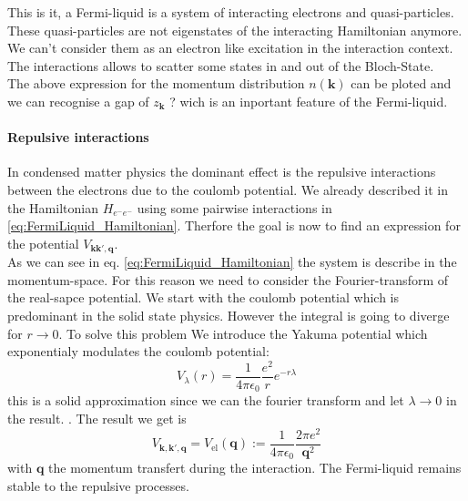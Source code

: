 \documentclass[../main.tex]{subfile}
\begin{document}
This is it, a Fermi-liquid is a system of interacting electrons and quasi-particles. These quasi-particles are not eigenstates of the interacting Hamiltonian anymore.
We can't consider them as an electron like excitation in the interaction context.
The interactions allows to scatter some states in and out of the Bloch-State. \\

The above expression for the momentum distribution $n(\bm{k})$ can be ploted and we can recognise a gap of $z_{\bm{k}}$ ?
wich is an inportant feature of the Fermi-liquid.\\

\paragraph{Repulsive interactions}
In condensed matter physics the dominant effect is the repulsive interactions between the electrons due to the coulomb potential. We already described it in the Hamiltonian 
$H_{e^-e^-}$ using some pairwise interactions in \ref{eq:FermiLiquid_Hamiltonian}. Therfore the goal is now to find an expression for the potential $V_{\bm{k}\bm{k}',\bm{q}}$.\\

As we can see in eq. \ref{eq:FermiLiquid_Hamiltonian} the system is describe in the momentum-space. For this reason we need to 
consider the Fourier-transform of the real-sapce potential. We start with the coulomb potential which is predominant in the solid state physics.
However the integral is going to diverge for $r\rightarrow 0$. To solve this problem We
introduce the Yakuma potential which exponentialy modulates the coulomb potential:
\begin{equation}
    V_{\lambda}(r) = \frac{1}{4\pi\epsilon_0} \frac{e^2}{r} e^{-r\lambda} \label{eq:Yakuma}
\end{equation}
this is a solid approximation since we can the fourier transform and let $\lambda\rightarrow 0$ in the result. .
The result we get is 
\begin{equation} \label{eq:Pot_repulsive_el}
    V_{\bm{k},\bm{k}',\bm{q}} = V_{\text{el}}(\bm{q}) := \frac{1}{4\pi\epsilon_0} \frac{2\pi e^2}{\bm{q}^2}
\end{equation}
with $\bm{q}$ the momentum transfert during the interaction. The Fermi-liquid remains stable to the repulsive processes.\\
\end{document}
